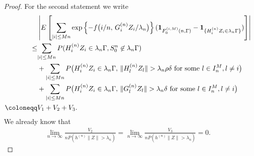 \documentclass[11pt,reqno]{amsart}
\numberwithin{equation}{section}
\newcommand{\writing}[1]{{\color{magenta}  {Writing: #1}}}
\theoremstyle{definition}
\theoremstyle{remark}
\theoremstyle{definition}
\newcommand{\one}{{\bf 1}}
\begin{document}
\begin{proof}


For the second statement we write 
\begin{align*}
   & \left|{E\left[\sum_{|i|\leq Mn}\exp\left\{ -   f\big(i/n, \, G_i^{(n)}
  Z_i/\lambda_n\big)\right\} (\one_{F_0^{(i, M)}(n, \Gamma)} -\one_{\{H_i^{(n)}Z_i \in \lambda_n \Gamma\}})\right]}\right|\\
  \leq & { \sum_{|i|\leq Mn}  P(H_i^{(n)}Z_i \in \lambda_n \Gamma, S_0^n \not \in \lambda_n \Gamma)} \\
  & + { \sum_{|i|\leq Mn} P\bigl(H_i^{(n)}Z_i \in \lambda_n \Gamma, \, 
    \|H_l^{(n)}Z_l\| > \lambda_n \rho
    \delta\ \text{for some} \ l \in I_n^M, l\not= i\bigr)} \\
  & +{ \sum_{|i|\leq Mn}  P\bigl(H_i^{(n)}Z_i \in \lambda_n \Gamma,  \, \|G_l^{(n)}Z_l\| > \lambda_n \delta\ \text{for some} \ l \in I_n^M, l\not= i\bigr)}\\
  \coloneqq &  V_1 + V_2 + V_3. 
\end{align*}
We already know that 
\begin{align*}
    \lim_{n\to \infty} \frac{V_2}{nP(h^{(n)}\|Z\| > \lambda_n)} =
  \lim_{n\to \infty} \frac{V_3}{nP(h^{(n)}\|Z\| > \lambda_n)} = 0. 
\end{align*}


\end{proof}
\end{document}
